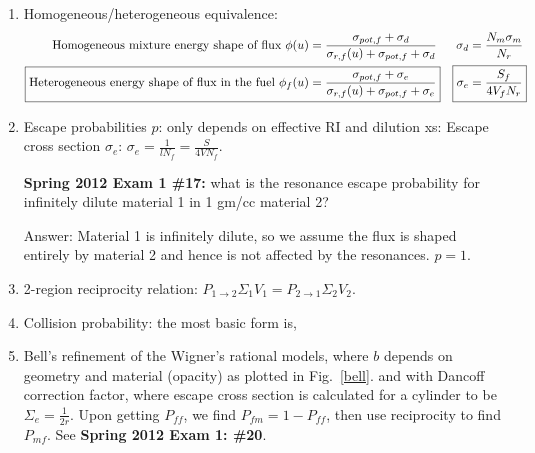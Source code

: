 \documentclass{school-22.211-notes}
\begin{document}
\clearpage
{} 
  \begin{enumerate}
    \item Homogeneous/heterogeneous equivalence: 
      \begin{align*}
        \mbox{Homogeneous mixture energy shape of flux } \phi(u) &= \frac{\sigma_{pot, f} + \sigma_d}{\sigma_{r,f} (u) + \sigma_{pot, f} + \sigma_d}   & \sigma_d &= \frac{N_m \sigma_m}{N_r}  \\
       \Aboxed{ \mbox{Heterogeneous energy shape of flux in the fuel } \phi_f(u) &= \frac{\sigma_{pot, f} + \sigma_e}{\sigma_{r,f} (u) + \sigma_{pot, f} + \sigma_e}}   & \Aboxed{ \sigma_e &= \frac{S_f}{4 V_f N_r}  }
      \end{align*}

    \item Escape probabilities $p$: only depends on effective RI and dilution xs: 
      Escape cross section $\sigma_e$:      $ \sigma_e = \frac{1}{l N_f} = \frac{S}{4V N_f}$. 

      \textbf{Spring 2012 Exam 1 \#17:} what is the resonance escape probability for infinitely dilute material 1 in 1 gm/cc material 2? 
 
      Answer: Material 1 is infinitely dilute, so we assume the flux is shaped entirely by material 2 and hence is not affected by the resonances. $p = 1$. 
 
    \item 2-region reciprocity relation: $\displaystyle \boxed{ P_{1\to 2} \Sigma_1 V_1 = P_{2\to 1} \Sigma_2 V_2}$. 

    \item Collision probability: the most basic form is, 

    \item Bell's refinement of the Wigner's rational models, where $b$ depends on geometry and material (opacity) as plotted in Fig.~\ref{bell}.
      and with Dancoff correction factor, 
      where escape cross section is calculated for a cylinder to be $\Sigma_e = \frac{1}{2r}$.  Upon getting $P_{ff}$, we find $P_{fm} = 1 - P_{ff}$, then use reciprocity to find $P_{mf}$. See \textbf{Spring 2012 Exam 1: \#20}. 


\end{enumerate}
\end{document}
